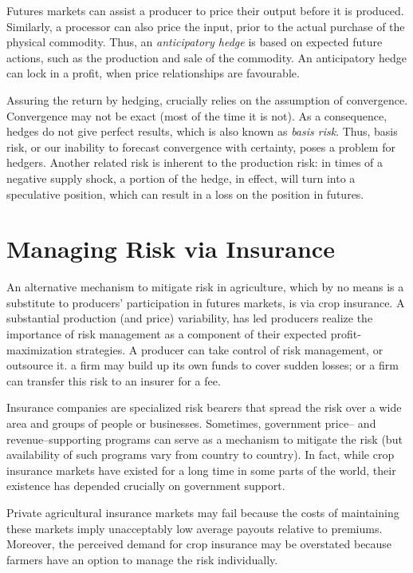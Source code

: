 \documentclass[
  oneside]{book}
\begin{document}
Futures markets can assist a producer to price their output before it is produced. Similarly, a processor can also price the input, prior to the actual purchase of the physical commodity. Thus, an \emph{anticipatory hedge} is based on expected future actions, such as the production and sale of the commodity. An anticipatory hedge can lock in a profit, when price relationships are favourable.

Assuring the return by hedging, crucially relies on the assumption of convergence. Convergence may not be exact (most of the time it is not). As a consequence, hedges do not give perfect results, which is also known as \emph{basis risk}. Thus, basis risk, or our inability to forecast convergence with certainty, poses a problem for hedgers. Another related risk is inherent to the production risk: in times of a negative supply shock, a portion of the hedge, in effect, will turn into a speculative position, which can result in a loss on the position in futures.

\hypertarget{managing-risk-via-insurance}{%
\section{Managing Risk via Insurance}\label{managing-risk-via-insurance}}

An alternative mechanism to mitigate risk in agriculture, which by no means is a substitute to producers' participation in futures markets, is via crop insurance. A substantial production (and price) variability, has led producers realize the importance of risk management as a component of their expected profit-maximization strategies. A producer can take control of risk management, or outsource it. a firm may build up its own funds to cover sudden losses; or a firm can transfer this risk to an insurer for a fee.

Insurance companies are specialized risk bearers that spread the risk over a wide area and groups of people or businesses. Sometimes, government price-- and revenue--supporting programs can serve as a mechanism to mitigate the risk (but availability of such programs vary from country to country). In fact, while crop insurance markets have existed for a long time in some parts of the world, their existence has depended crucially on government support.

Private agricultural insurance markets may fail because the costs of maintaining these markets imply unacceptably low average payouts relative to premiums. Moreover, the perceived demand for crop insurance may be overstated because farmers have an option to manage the risk individually.
\end{document}
